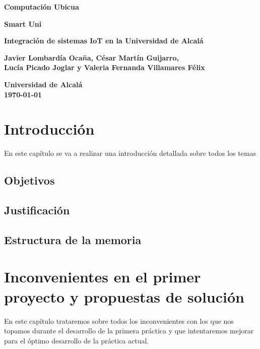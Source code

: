 \documentclass[12pt]{report}
\begin{document}
\begin{titlepage}
    \begin{center}
        \vspace*{1cm}
        
        \textbf{\huge Computación Ubicua}
        
        \vspace{0.5cm}
        \textbf{\large Smart Uni}
        
        \vspace{1.5cm}
        
        \textbf{\huge Integración de sistemas IoT en la Universidad de Alcalá}
        
        \vspace{2cm}
        
        \textbf{\large Javier Lombardía Ocaña, César Martín Guijarro,}\\
        \textbf{\large Lucía Picado Joglar y Valeria Fernanda Villamares Félix}
        
        \vfill
        
        \textbf{\large Universidad de Alcalá}\\
        \textbf{\large \today}
        
    \end{center}
\end{titlepage}


\tableofcontents



\chapter{Introducción}
En este capítulo se va a realizar una introducción detallada sobre todos los temas
\section{Objetivos}
\newpage
\section{Justificación}
\newpage
\section{Estructura de la memoria}

\chapter{Inconvenientes en el primer proyecto y propuestas de solución}
En este capítulo trataremos sobre todos los inconvenientes con los que nos topamos durante el desarrollo de la primera práctica y que intentaremos mejorar para el óptimo desarrollo de la práctica actual.
\end{document}
